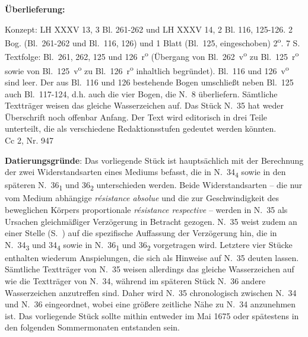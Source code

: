 \begin{ledgroupsized}[r]{120mm}
\footnotesize
\pstart
\noindent\textbf{\"{U}berlieferung:}
\pend
\end{ledgroupsized}
\begin{ledgroupsized}[r]{114mm}
\footnotesize
\pstart \parindent -6mm
Konzept: LH XXXV 13, 3 Bl. 261-262 und LH XXXV 14, 2 Bl. 116, 125-126. 2 Bog. (Bl.~261-262 und Bl.~116, 126) und 1 Blatt (Bl.~125, eingeschoben) 2\textsuperscript{o}.
7 S. Textfolge: Bl.~261, 262, 125 und 126~r\textsuperscript{o}
(\"{U}bergang von Bl.~262~v\textsuperscript{o} zu Bl.~125~r\textsuperscript{o}
sowie von Bl.~125~v\textsuperscript{o} zu Bl.~126~r\textsuperscript{o} inhaltlich begr\"{u}ndet).
Bl.~116 und 126~v\textsuperscript{o} sind leer.
Der aus Bl.~116 und 126 bestehende Bogen umschließt neben Bl.~125 auch Bl.~117-124, d.h. auch die vier Bogen, die N.~8 überliefern.
Sämtliche Texttr\"{a}ger weisen das gleiche Wasserzeichen auf.
Das Stück N.~35 hat weder \"{U}berschrift noch offenbar Anfang.
Der Text wird editorisch in drei Teile unterteilt, die als verschiedene Redaktionsstufen gedeutet werden k\"{o}nnten.%
 \\Cc 2, Nr. 947
\pend
\end{ledgroupsized}
\vspace*{5mm}
\begin{ledgroup}
\footnotesize 
\pstart
\noindent\footnotesize{\textbf{Datierungsgr\"{u}nde}: Das vorliegende St\"{u}ck ist haupts\"{a}chlich mit der Berechnung der zwei Widerstands\-arten eines Mediums befasst,
die in N.~34\textsubscript{4} sowie in den sp\"{a}teren N.~36\textsubscript{1} und 36\textsubscript{2} unterschieden werden.
Beide Widerstandsarten -- die nur vom Medium abh\"{a}ngige \textit{r\'{e}sistance absolue} und die zur Geschwindigkeit des beweglichen K\"{o}rpers proportionale \textit{r\'{e}sistance respective} -- werden in N.~35 als Ursachen gleichm\"{a}{\ss}iger Verz\"{o}gerung in Betracht gezogen.
N.~35 weist zudem an einer Stelle (S.~) auf die spezifische Auffassung der Verz\"{o}gerung hin,
die in N.~34\textsubscript{3} und 34\textsubscript{4} sowie in N.~36\textsubscript{1} und 36\textsubscript{2} vorgetragen wird.
Letztere vier St\"{u}cke enthalten wiederum Anspielungen, die sich als Hinweise auf N.~35 deuten lassen.
S\"{a}mtliche Texttr\"{a}ger von N.~35 weisen allerdings das gleiche Wasserzeichen auf wie die Texttr\"{a}ger von N.~34,
w\"{a}hrend im sp\"{a}teren Stück N.~36 andere Wasserzeichen anzutreffen sind.
Daher wird N.~35 chronologisch zwischen N.~34 und N.~36 eingeordnet,
wobei eine gr\"{o}{\ss}ere zeitliche N\"{a}he zu N.~34 anzunehmen ist.
Das vorliegende St\"{u}ck sollte mithin entweder im Mai 1675 oder sp\"{a}testens in den folgenden Sommermonaten entstanden sein.}%
\pend
\end{ledgroup}

